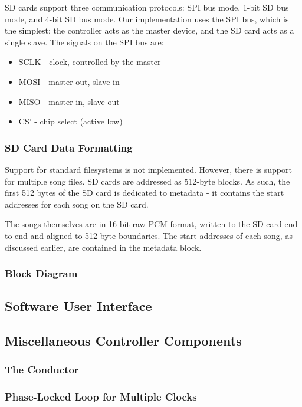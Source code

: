 \documentclass{article}
\begin{document}
SD cards support three communication protocols: SPI bus mode, 1-bit SD bus
mode, and 4-bit SD bus mode. Our implementation uses the SPI bus, which is the
simplest; the controller acts as the master device, and the SD card acts as a
single slave.  The signals on the SPI bus are:
\begin{itemize}
	\item SCLK - clock, controlled by the master
	\item MOSI - master out, slave in
	\item MISO - master in, slave out
	\item CS' - chip select (active low)
\end{itemize}

\subsubsection{SD Card Data Formatting}

Support for standard filesystems is not implemented. However, there is support
for multiple song files. SD cards are addressed as 512-byte blocks. As such,
the first 512 bytes of the SD card is dedicated to metadata - it contains the
start addresses for each song on the SD card.

The songs themselves are in 16-bit raw PCM format, written to the SD card end
to end and aligned to 512 byte boundaries. The start addresses of each
song, as discussed earlier, are contained in the metadata block.

\subsubsection{Block Diagram}



\subsection{Software User Interface}

\subsection{Miscellaneous Controller Components}
\subsubsection{The Conductor}
\subsubsection{Phase-Locked Loop for Multiple Clocks}
\end{document}
